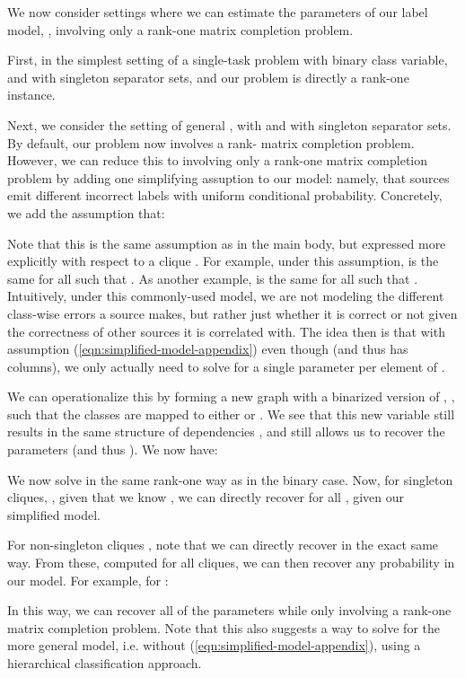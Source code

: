 \documentclass[letterpaper]{article}
\begin{document}
\begin{appendix}
We now consider settings where we can estimate the parameters of our label model, , involving only a rank-one matrix completion problem.

First, in the simplest setting of a single-task problem with binary class variable,  and  with singleton separator sets,  and our problem is directly a rank-one instance.

Next, we consider the setting of general , with  and  with singleton separator sets.
By default, our problem now involves a rank- matrix completion problem.
However, we can reduce this to involving only a rank-one matrix completion problem by adding one simplifying assuption to our model: namely, that sources emit different incorrect labels with uniform conditional probability.
Concretely, we add the assumption that:

Note that this is the same assumption as in the main body, but expressed more explicitly with respect to a clique .
For example, under this assumption,  is the same for all  such that .
As another example,  is the same for all  such that .
Intuitively, under this commonly-used model, we are not modeling the different class-wise errors a source makes, but rather just whether it is correct or not given the correctness of other sources it is correlated with.
The idea then is that with assumption (\ref{eqn:simplified-model-appendix}) even though  (and thus  has  columns), we only actually need to solve for a single parameter per element of .

We can operationalize this by forming a new graph with a binarized version of , , such that the  classes are mapped to either  or .
We see that this new variable still results in the same structure of dependencies , and still allows us to recover the parameters  (and thus ).
We now have:

We now solve in the same rank-one way as in the binary  case.
Now, for singleton cliques, , given that we know , we can directly recover  for all , given our simplified model.

For non-singleton cliques , note that we can directly recover  in the exact same way.
From these, computed for all cliques, we can then recover any probability in our model.
For example, for :

In this way, we can recover all of the parameters  while only involving a rank-one matrix completion problem.
Note that this also suggests a way to solve for the more general model, i.e. without (\ref{eqn:simplified-model-appendix}), using a hierarchical classification approach.




\end{appendix}
\end{document}
